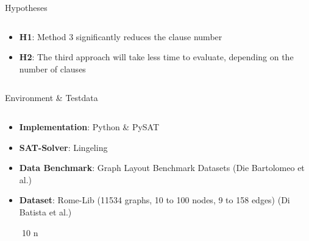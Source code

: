 \documentclass[hyperref={pdfpagelabels=false},aspectratio=169]{beamer}
\theoremstyle{definition}
\begin{document}
\begin{frame}{Hypotheses}
    \begin{columns}
        \begin{column}{1\textwidth}
            \begin{itemize}
                \item \textbf{H1}: Method 3 significantly reduces the clause number
                \item \textbf{H2}: The third approach will take less time to evaluate, depending on the number of clauses
            \end{itemize}
        \end{column}
    \end{columns}
\end{frame}

\begin{frame}{Environment \& Testdata}
    \begin{columns}
        \begin{column}{1\textwidth}
            \begin{itemize}
                \item \textbf{Implementation}: Python \& PySAT
                \item \textbf{SAT-Solver}: Lingeling
                \item \textbf{Data Benchmark}: Graph Layout Benchmark Datasets (Die Bartolomeo et al.) 
                \item \textbf{Dataset}: Rome-Lib (11534 graphs, 10 to 100 nodes, 9 to 158 edges) (Di Batista et al.)
            \end{itemize}
            \, \, \, \, \rightarrow {} 10 \times n 
        \end{column}
    \end{columns}
\end{frame}
\end{document}

